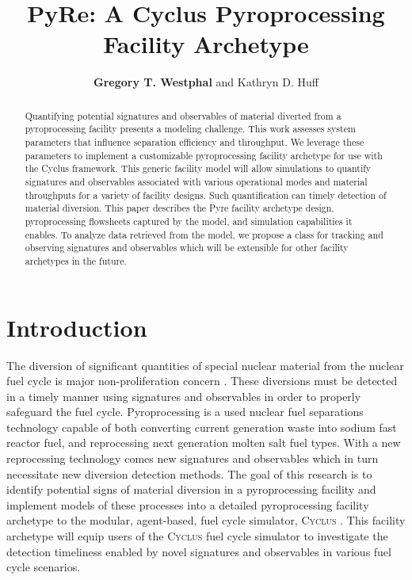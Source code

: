 \documentclass{anstrans}
\title{PyRe: A Cyclus Pyroprocessing Facility Archetype}
\author{\textbf{Gregory T. Westphal} and Kathryn D. Huff}
\institute{
Dept. of Nuclear, Plasma and Radiological Engineering, University of Illinois at Urbana-Champaign \\
gtw2@illinois.edu
}
\newcommand{\Cyclus}{\textsc{Cyclus}\xspace}%
\begin{document}
\begin{abstract}
Quantifying potential signatures and observables of material diverted from a 
pyroprocessing facility presents a modeling challenge.  This work assesses 
system parameters that influence separation efficiency and throughput. We 
leverage these parameters to implement a customizable pyroprocessing facility 
archetype for use with the Cyclus framework.  This generic facility model will 
allow simulations to quantify signatures and observables associated with 
various operational modes and material throughputs for a variety of facility 
designs. Such quantification can timely detection of material diversion.  This 
paper describes the Pyre facility archetype design, pyroprocessing flowsheets 
captured by the model, and simulation capabilities it enables.  To analyze data 
retrieved from the model, we propose a class for tracking and observing 
signatures and observables which will be extensible for other facility 
archetypes in the future.
\end{abstract}
\section{Introduction}
The diversion of significant quantities of special nuclear material from the 
nuclear fuel cycle is major non-proliferation concern 
\cite{noauthor_iaea_2017}. These diversions must be detected in a timely manner 
using signatures and observables in order to properly safeguard the fuel cycle. 
Pyroprocessing is a used nuclear fuel separations technology capable of both 
converting current generation waste into sodium fast reactor fuel, and 
reprocessing next generation molten salt fuel types.  With a new reprocessing 
technology comes new signatures and observables which in turn necessitate new 
diversion detection methods.  The goal of this research is to identify 
potential signs of material diversion in a pyroprocessing facility and 
implement models of these processes into a detailed pyroprocessing facility 
archetype to the modular, agent-based, fuel cycle simulator, \Cyclus 
\cite{huff_fundamental_2016}. This facility archetype will equip users of the 
\Cyclus fuel cycle simulator to investigate the detection timeliness enabled by 
novel signatures and observables in various fuel cycle scenarios.
\end{document}
